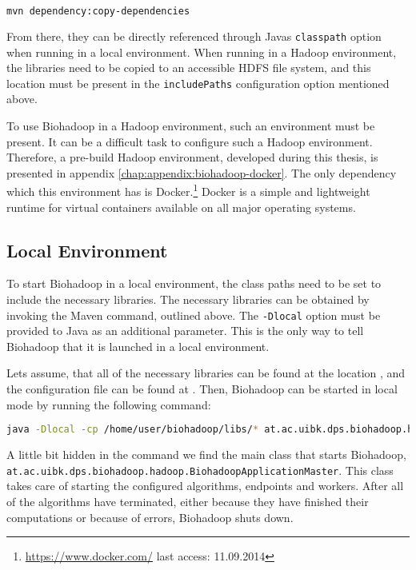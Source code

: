 \begin{lstlisting}[language=bash]
mvn dependency:copy-dependencies
\end{lstlisting}

From there, they can be directly referenced through Javas \texttt{classpath} option when running in a local environment. When running in a Hadoop environment, the libraries need to be copied to an accessible HDFS file system, and this location must be present in the \texttt{includePaths} configuration option mentioned above.
 
To use Biohadoop in a Hadoop environment, such an environment must be present. It can be a difficult task to configure such a Hadoop environment. Therefore, a pre-build Hadoop environment, developed during this thesis, is presented in appendix \ref{chap:appendix:biohadoop-docker}. The only dependency which this environment has is Docker.\footnote{\url{https://www.docker.com/} last access: 11.09.2014} Docker is a simple and lightweight runtime for virtual containers available on all major operating systems.

\subsection{Local Environment}
\label{chap:usage:local}
To start Biohadoop in a local environment, the class paths need to be set to include the necessary libraries. The necessary libraries can be obtained by invoking the Maven command, outlined above. The \texttt{-Dlocal} option must be provided to Java as an additional parameter. This is the only way to tell Biohadoop that it is launched in a local environment.

Lets assume, that all of the necessary libraries can be found at the location , and the configuration file can be found at . Then, Biohadoop can be started in local mode by running the following command:
  
\begin{lstlisting}[language=bash]
java -Dlocal -cp /home/user/biohadoop/libs/* at.ac.uibk.dps.biohadoop.hadoop.BiohadoopApplicationMaster /home/user/biohadoop/configs/simple-config-json
\end{lstlisting}

A little bit hidden in the command we find the main class that starts Biohadoop, \texttt{at.ac.uibk.dps.biohadoop.hadoop.BiohadoopApplicationMaster}. This class takes care of starting the configured algorithms, endpoints and workers. After all of the algorithms have terminated, either because they have finished their computations or because of errors, Biohadoop shuts down.

